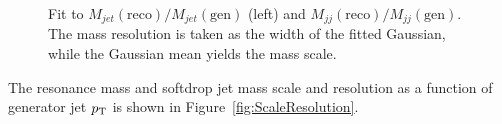 \begin{figure}[h!]
\caption{ Fit to $M_{jet}(\mathrm{reco})/M_{jet}(\mathrm{gen})$ (left) and $M_{jj}(\mathrm{reco})/M_{jj}(\mathrm{gen})$. 
The mass resolution is taken as the width of the fitted Gaussian, while the Gaussian mean yields the mass scale.}
\label{fig:resoFits}
\end{figure}
The resonance mass and softdrop jet mass scale and resolution as a function of generator jet $p_{\mathrm{T}}$ is shown in Figure~\ref{fig:ScaleResolution}.
\begin{figure}[h!]
\centering
{}
\\

\end{figure}
